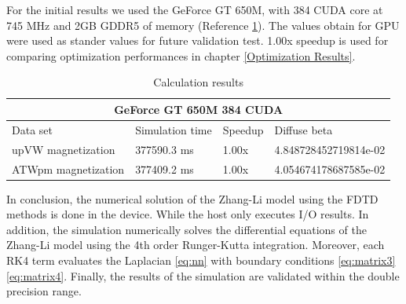 For the initial results we used the GeForce GT 650M, with 384 CUDA core at 745 MHz and 2GB GDDR5 of memory (Reference \ref{tab:results}). The values obtain for GPU were used as stander values for  future validation test. 1.00x speedup is used for comparing optimization performances in chapter \ref{Optimization Results}.

\begin{table}[h]
\centering
\begin{tabular}{| l | l | l | l |}
\hline
\multicolumn{4}{|c|}{GeForce GT 650M  384 CUDA} \\
\hline
Data set & Simulation time & Speedup & Diffuse beta  \\
\hline
upVW magnetization & 377590.3 ms & 1.00x & 4.848728452719814e-02 \\
\hline
ATWpm magnetization & 377409.2 ms & 1.00x & 4.054674178687585e-02 \\
\hline
\end{tabular}
\caption{Calculation results}
\label{tab:results}
\end{table}


\vspace{4.0em}

In conclusion, the numerical solution of the Zhang-Li model using the FDTD methods is done in the device. While the host only executes I/O results. In addition, the simulation numerically solves the differential equations of the Zhang-Li model using the 4th order Runger-Kutta integration. Moreover, each RK4 term evaluates the Laplacian \ref{eq:nn} with boundary conditions \ref{eq:matrix3} \ref{eq:matrix4}. Finally, the results of the simulation are validated within the double precision range.



